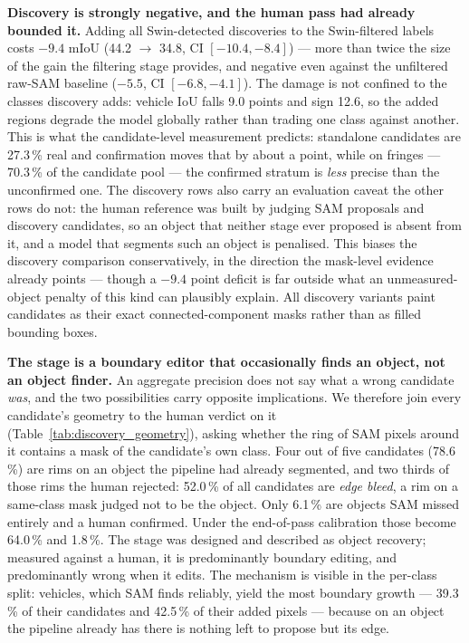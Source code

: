 \documentclass[conference]{IEEEtran}
\begin{document}
\textbf{Discovery is strongly negative, and the human pass had already bounded it.}
Adding all Swin-detected discoveries to the Swin-filtered labels costs $-9.4$ mIoU
(44.2 $\to$ 34.8, CI $[-10.4, -8.4]$) --- more than twice the size of the gain the filtering stage
provides, and negative even against the unfiltered raw-SAM baseline ($-5.5$, CI $[-6.8, -4.1]$). The
damage is not confined to the classes discovery adds: vehicle IoU falls 9.0 points and sign 12.6, so
the added regions degrade the model globally rather than trading one class against another. This is
what the candidate-level measurement predicts: standalone candidates are 27.3\,\% real and
confirmation moves that by about a point, while on fringes --- 70.3\,\% of the candidate pool --- the
confirmed stratum is \emph{less} precise than the unconfirmed one.
The discovery rows also carry an evaluation caveat the other rows do not: the human reference was
built by judging SAM proposals and discovery candidates, so an object that neither stage ever proposed
is absent from it, and a model that segments such an object is penalised. This biases the discovery
comparison conservatively, in the direction the mask-level evidence already points --- though a
$-9.4$ point deficit is far outside what an unmeasured-object penalty of this kind can plausibly
explain.
All discovery variants paint candidates as their exact connected-component masks rather than as filled
bounding boxes.

\textbf{The stage is a boundary editor that occasionally finds an object, not an object finder.}
An aggregate precision does not say what a wrong candidate \emph{was}, and the two possibilities carry
opposite implications. We therefore join every candidate's geometry to the human verdict on it
(Table~\ref{tab:discovery_geometry}), asking whether the ring of SAM pixels around it contains a mask
of the candidate's own class.
Four out of five candidates (78.6\,\%) are rims on an object the pipeline had already segmented, and
two thirds of those rims the human rejected: 52.0\,\% of all candidates are \emph{edge bleed}, a rim
on a same-class mask judged not to be the object. Only 6.1\,\% are objects SAM missed entirely and a
human confirmed. Under the end-of-pass calibration those become 64.0\,\% and 1.8\,\%.
The stage was designed and described as object recovery; measured against a human, it is
predominantly boundary editing, and predominantly wrong when it edits.
The mechanism is visible in the per-class split: vehicles, which SAM finds reliably, yield the most
boundary growth --- 39.3\,\% of their candidates and 42.5\,\% of their added pixels --- because on an
object the pipeline already has there is nothing left to propose but its edge.
\end{document}
